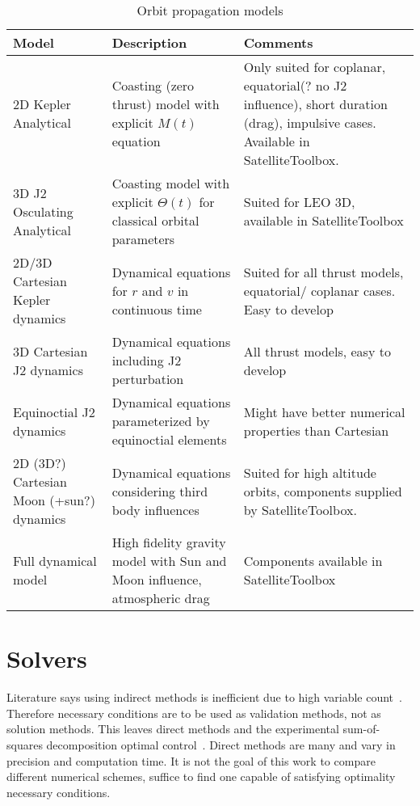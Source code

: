 \begin{table}[htbp]
    \centering
    \begin{tabular}{>{\centering\arraybackslash}m{5cm}>{\centering\arraybackslash}m{5cm}>{\centering\arraybackslash}m{5cm}}\toprule
        \textbf{Model} & \textbf{Description} & \textbf{Comments} \\ \midrule
        2D Kepler Analytical & Coasting (zero thrust) model with explicit \(M(t)\) equation & Only suited for coplanar, equatorial(? no J2 influence), short duration (drag), impulsive cases. Available in SatelliteToolbox. \\ \midrule
        3D J2 Osculating Analytical & Coasting model with explicit \(\Theta(t)\) for classical orbital parameters & Suited for LEO 3D, available in SatelliteToolbox \\ \midrule
        2D/3D Cartesian Kepler dynamics & Dynamical equations for \(r\) and \(v\) in continuous time & Suited for all thrust models, equatorial/ coplanar cases. Easy to develop \\ \midrule
        3D Cartesian J2 dynamics & Dynamical equations including J2 perturbation & All thrust models, easy to develop \\ \midrule
        Equinoctial J2 dynamics & Dynamical equations parameterized by equinoctial elements & Might have better numerical properties than Cartesian \\ \midrule
        2D (3D?) Cartesian Moon (+sun?) dynamics & Dynamical equations considering third body influences & Suited for high altitude orbits, components supplied by SatelliteToolbox. \\ \midrule
        Full dynamical model & High fidelity gravity model with Sun and Moon influence, atmospheric drag & Components available in SatelliteToolbox \\ \bottomrule
    \end{tabular}
    \caption{Orbit propagation models}\label{tab:orb_models}
\end{table}

\section{Solvers}

Literature says using indirect methods is inefficient due to high variable count~\cite{Conway_2010}. Therefore necessary conditions are to be used as validation methods, not as solution methods. This leaves direct methods and the experimental sum-of-squares decomposition optimal control~\cite{henrion_occ_meas}. Direct methods are many and vary in precision and computation time. It is not the goal of this work to compare different numerical schemes, suffice to find one capable of satisfying optimality necessary conditions. 

